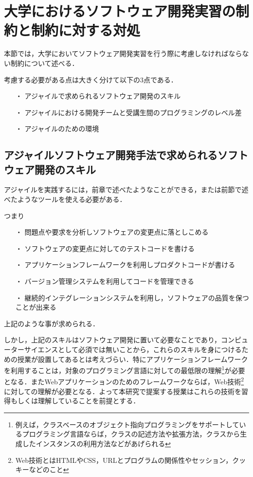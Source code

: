 \section{大学におけるソフトウェア開発実習の制約と制約に対する対処}

本節では，大学においてソフトウェア開発実習を行う際に考慮しなければならない制約について述べる．

考慮する必要がある点は大きく分けて以下の3点である．

\begin{itemize}
\item[・] アジャイルで求められるソフトウェア開発のスキル
\item[・] アジャイルにおける開発チームと受講生間のプログラミングのレベル差
\item[・] アジャイルのための環境
\end{itemize}

\subsection{アジャイルソフトウェア開発手法で求められるソフトウェア開発のスキル}

アジャイルを実践するには，前章で述べたようなことができる，または前節で述べたようなツールを使える必要がある．

つまり

\begin{itemize}
\item[・]問題点や要求を分析しソフトウェアの変更点に落としこめる
\item[・]ソフトウェアの変更点に対してのテストコードを書ける
\item[・]アプリケーションフレームワークを利用しプロダクトコードが書ける
\item[・]バージョン管理システムを利用してコードを管理できる
\item[・]継続的インテグレーションシステムを利用し，ソフトウェアの品質を保つことが出来る
\end{itemize}

上記のような事が求められる．

しかし，上記のスキルはソフトウェア開発に置いて必要なことであり，コンピューターサイエンスとして必須では無いことから，これらのスキルを身につけるための授業が設置してあるとは考えづらい．特にアプリケーションフレームワークを利用することは，対象のプログラミング言語に対しての最低限の理解\footnote{例えば，クラスベースのオブジェクト指向プログラミングをサポートしているプログラミング言語ならば，クラスの記述方法や拡張方法，クラスから生成したインスタンスの利用方法などがあげられる}が必要となる．またWebアプリケーションのためのフレームワークならば，Web技術\footnote{Web技術とはHTMLやCSS，URLとプログラムの関係性やセッション，クッキーなどのこと}に対しての理解が必要となる．よって本研究で提案する授業はこれらの技術を習得もしくは理解していることを前提とする．


